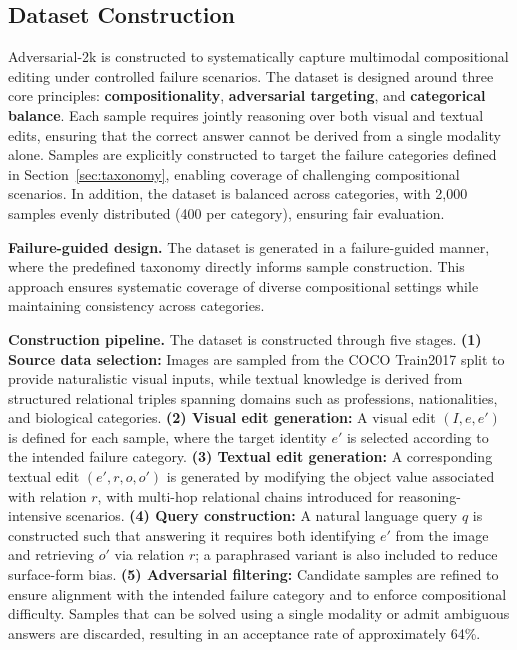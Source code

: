 \documentclass{article}
\begin{document}
\subsection{Dataset Construction}
\label{sec:dataset_construction}

Adversarial-2k is constructed to systematically capture multimodal compositional editing under controlled failure scenarios. The dataset is designed around three core principles: \textbf{compositionality}, \textbf{adversarial targeting}, and \textbf{categorical balance}. Each sample requires jointly reasoning over both visual and textual edits, ensuring that the correct answer cannot be derived from a single modality alone. Samples are explicitly constructed to target the failure categories defined in Section~\ref{sec:taxonomy}, enabling coverage of challenging compositional scenarios. In addition, the dataset is balanced across categories, with 2{,}000 samples evenly distributed (400 per category), ensuring fair evaluation.

\textbf{Failure-guided design.}
The dataset is generated in a failure-guided manner, where the predefined taxonomy directly informs sample construction. This approach ensures systematic coverage of diverse compositional settings while maintaining consistency across categories.

\textbf{Construction pipeline.}
The dataset is constructed through five stages. \textbf{(1) Source data selection:} Images are sampled from the COCO Train2017 split to provide naturalistic visual inputs, while textual knowledge is derived from structured relational triples spanning domains such as professions, nationalities, and biological categories. \textbf{(2) Visual edit generation:} A visual edit $(I, e, e')$ is defined for each sample, where the target identity $e'$ is selected according to the intended failure category. \textbf{(3) Textual edit generation:} A corresponding textual edit $(e', r, o, o')$ is generated by modifying the object value associated with relation $r$, with multi-hop relational chains introduced for reasoning-intensive scenarios. \textbf{(4) Query construction:} A natural language query $q$ is constructed such that answering it requires both identifying $e'$ from the image and retrieving $o'$ via relation $r$; a paraphrased variant is also included to reduce surface-form bias. \textbf{(5) Adversarial filtering:} Candidate samples are refined to ensure alignment with the intended failure category and to enforce compositional difficulty. Samples that can be solved using a single modality or admit ambiguous answers are discarded, resulting in an acceptance rate of approximately 64\%.
\end{document}
